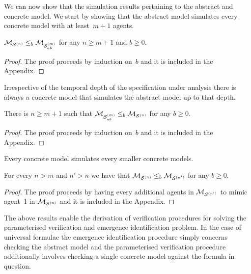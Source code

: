 We can now show that the simulation results pertaining to the abstract and
concrete model.  We start by showing that the abstract model simulates every
concrete model with at least~$m+1$ agents.

\begin{theorem}
\label{th:ab-concr-sim}
$\mathcal{M}_{\mathcal{S}^{(n)}} \leq_b \mathcal{M}_{\mathcal{S}_{ab}^{(m)}}$ for any $n \geq m+1$ and $b \geq 0$.
\end{theorem}
\begin{proof}
The proof proceeds by induction on~$b$ and it is included in the Appendix.
\end{proof}

Irrespective of the temporal depth of the specification under
analysis there is always a concrete model that simulates the abstract model up
to that depth.

\begin{theorem}
\label{th:concr-ab-sim}
There is $n \geq m+1$ such that $\mathcal{M}_{\mathcal{S}_{ab}^{(m)}} \leq_b \mathcal{M}_{\mathcal{S}^{(n)}}$ for any $b \geq 0$.
\end{theorem}
\begin{proof}
The proof proceeds by induction on~$b$ and it is included in the Appendix.
\end{proof}


Every concrete model simulates every smaller concrete models.

\begin{theorem}
\label{th:concr-sim}
For every $n > m$ and $n' > n$ we have that $\mathcal{M}_{\mathcal{S}^{(n)}} \leq_b \mathcal{M}_{\mathcal{S}^{(n')}}$ for any
$b \geq 0$.
\end{theorem}
\begin{proof}
The proof proceeds by having every additional agents in $\mathcal{M}_{\mathcal{S}^{(n')}}$ to mimic
agent~1 in $\mathcal{M}_{\mathcal{S}^{(n)}}$ and it is included in the Appendix.
\end{proof}

The above results enable the derivation of verification procedures for solving
the parameterised verification and emergence identification problem. In the case
of universal formulae the emergence identification procedure simply concerns
checking the abstract model and the parameterised verification procedure 
additionally involves checking a single concrete model against the formula in
question.

